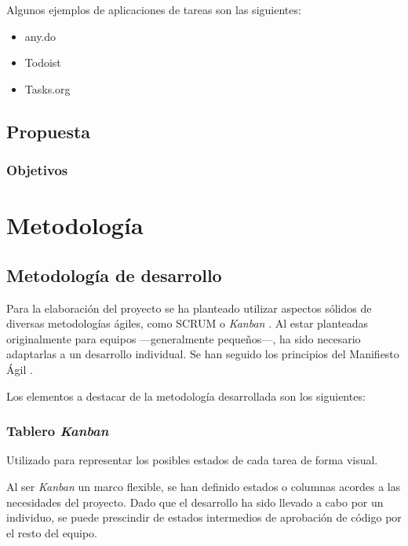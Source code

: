 \documentclass[10pt, a4paper]{aqademic}
\begin{document}
\medskip

Algunos ejemplos de aplicaciones de tareas son las siguientes:

\begin{itemize}
	\item any.do
	\item Todoist
	\item Tasks.org
\end{itemize}


\section{Propuesta}

\subsection{Objetivos}



\chapter{Metodología}

\section{Metodología de desarrollo}

Para la elaboración del proyecto se ha planteado utilizar aspectos sólidos de diversas metodologías ágiles, como SCRUM \cite{schwaber2017scrum} o \textit{Kanban} \cite{kanban}. Al estar planteadas originalmente para equipos ---generalmente pequeños---, ha sido necesario adaptarlas a un desarrollo individual. Se han seguido los principios del Manifiesto Ágil \cite{beck2001agile}.

\medskip

Los elementos a destacar de la metodología desarrollada son los siguientes:

\subsection*{Tablero \textit{Kanban}}

Utilizado para representar los posibles estados de cada tarea de forma visual.

\medskip

Al ser \textit{Kanban} un marco flexible, se han definido estados o columnas acordes a las necesidades del proyecto. Dado que el desarrollo ha sido llevado a cabo por un individuo, se puede prescindir de estados intermedios de aprobación de código por el resto del equipo.
\end{document}
